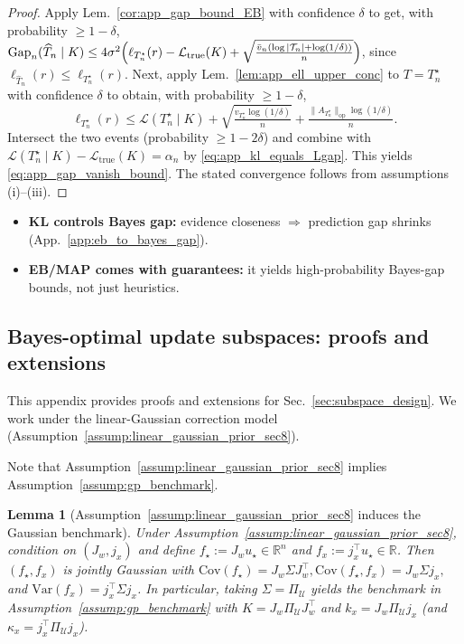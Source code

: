 \documentclass{article}
\theoremstyle{plain}
\newtheorem{lemma}[theorem]{Lemma}
\theoremstyle{definition}
\theoremstyle{remark}
\begin{document}
\begin{proof}
Apply Lem.~\ref{cor:app_gap_bound_EB} with confidence $\delta$ to get, with probability $\ge 1-\delta$, $\mathrm{Gap}_n(\widehat T_n\mid K)
\le
4\sigma^2\Bigl(\ell_{T_n^\star}(r)-\mathcal L_{\mathrm{true}}(K)
+
\sqrt{\tfrac{\bar v_n(\log|\mathcal T_n|+\log(1/\delta))}{n}}\Bigr)$,
since $\ell_{\widehat T_n}(r)\le \ell_{T_n^\star}(r)$.
Next, apply Lem.~\ref{lem:app_ell_upper_conc} to $T=T_n^\star$ with confidence $\delta$ to obtain, with probability
$\ge 1-\delta$,
\[
\ell_{T_n^\star}(r)
\le
\mathcal L(T_n^\star\mid K)
+
\sqrt{\tfrac{v_{T_n^\star}\log(1/\delta)}{n}}
+
\tfrac{\|A_{T_n^\star}\|_{\mathrm{op}}\log(1/\delta)}{n}.
\]
Intersect the two events (probability $\ge 1-2\delta$) and combine with
$\mathcal L(T_n^\star\mid K)-\mathcal L_{\mathrm{true}}(K)=\alpha_n$ by \eqref{eq:app_kl_equals_Lgap}.
This yields \eqref{eq:app_gap_vanish_bound}. The stated convergence follows from assumptions (i)--(iii).
\end{proof}

\begin{takeawaybox}[title=\textbf{Summary: Evidence tuning does more than “avoid overfit”}]
\begin{itemize}[leftmargin=*, itemsep=0pt, topsep=0pt]
\item \textbf{KL controls Bayes gap:} evidence closeness $\Rightarrow$ prediction gap shrinks (App.~\ref{app:eb_to_bayes_gap}).
\item \textbf{EB/MAP comes with guarantees:} it yields high-probability Bayes-gap bounds, not just heuristics.
\end{itemize}
\end{takeawaybox}






\subsection{Bayes-optimal update subspaces: proofs and extensions}
\label{app:subspace}
This appendix provides proofs and extensions for Sec.~\ref{sec:subspace_design}. We work under the
linear-Gaussian correction model (Assumption~\ref{assump:linear_gaussian_prior_sec8}).

Note that Assumption~\ref{assump:linear_gaussian_prior_sec8} implies Assumption~\ref{assump:gp_benchmark}.
\begin{lemma}[Assumption~\ref{assump:linear_gaussian_prior_sec8} induces the Gaussian benchmark]
\label{lem:lg_implies_gp}
Under Assumption~\ref{assump:linear_gaussian_prior_sec8}, condition on $(J_w,j_x)$ and define
$f_\star:=J_w u_\star\in\mathbb R^n$ and $f_x:=j_x^\top u_\star\in\mathbb R$.
Then $(f_\star,f_x)$ is jointly Gaussian with $\mathrm{Cov}(f_\star)=J_w\Sigma J_w^\top,
\mathrm{Cov}(f_\star,f_x)=J_w\Sigma j_x,$ and $\mathrm{Var}(f_x)=j_x^\top \Sigma j_x$.
In particular, taking $\Sigma=\Pi_{\mathcal U}$ yields the benchmark in Assumption~\ref{assump:gp_benchmark} with
$K=J_w\Pi_{\mathcal U}J_w^\top$ and $k_x=J_w\Pi_{\mathcal U}j_x$ (and $\kappa_x=j_x^\top\Pi_{\mathcal U}j_x$).
\end{lemma}
\end{document}
